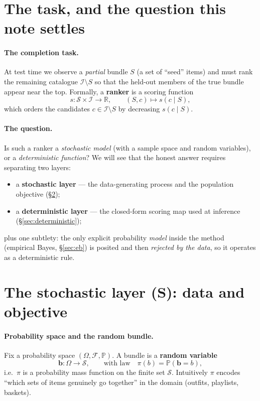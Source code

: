 \documentclass[11pt]{article}
\theoremstyle{remark}
\newcommand{\I}{\mathcal{I}}
\newcommand{\Sfam}{\mathcal{S}}
\newcommand{\R}{\mathbb{R}}
\newcommand{\Prob}{\mathbb{P}}
\begin{document}
\section{The task, and the question this note settles}
\label{sec:task}

\paragraph{The completion task.} At test time we observe a \emph{partial} bundle $S$ (a set of ``seed'' items) and
must rank the remaining catalogue $\I\setminus S$ so that the held-out members of the true bundle appear near the
top. Formally, a \textbf{ranker} is a scoring function
\[
  s:\Sfam\times\I\to\R,\qquad (S,c)\mapsto s(c\mid S),
\]
which orders the candidates $c\in\I\setminus S$ by decreasing $s(c\mid S)$.

\paragraph{The question.} Is such a ranker a \emph{stochastic model} (with a sample space and random variables), or
a \emph{deterministic function}? We will see that the honest answer requires separating two layers:
\begin{itemize}
  \item[(S)] a \textbf{stochastic layer} --- the data-generating process and the population objective
  (\S\ref{sec:stochastic});
  \item[(D)] a \textbf{deterministic layer} --- the closed-form scoring map used at inference
  (\S\ref{sec:deterministic});
\end{itemize}
plus one subtlety: the only explicit probability \emph{model} inside the method (empirical Bayes,
\S\ref{sec:eb}) is posited and then \emph{rejected by the data}, so it operates as a deterministic rule.

\section{The stochastic layer (S): data and objective}
\label{sec:stochastic}

\paragraph{Probability space and the random bundle.} Fix a probability space $(\Omega,\mathcal F,\Prob)$. A bundle
is a \textbf{random variable}
\[
  \mathbf b:\Omega\to\Sfam,\qquad \text{with law}\quad \pi(b)=\Prob(\mathbf b=b),
\]
i.e.\ $\pi$ is a probability mass function on the finite set $\Sfam$. Intuitively $\pi$ encodes ``which sets of
items genuinely go together'' in the domain (outfits, playlists, baskets).
\end{document}
